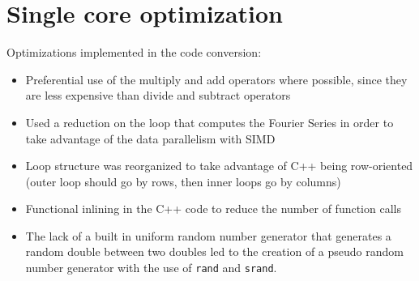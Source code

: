 \section{Single core optimization}
Optimizations implemented in the code conversion:
\begin{itemize}
\item Preferential use of the multiply and add operators where possible, since
they are less expensive than divide and subtract operators
\item Used a reduction on the loop that computes the Fourier Series
  in order to take advantage of the data parallelism with SIMD
\item Loop structure was reorganized to take advantage of C++ being
  row-oriented (outer loop should go by rows, then inner loops go by columns)
\item Functional inlining in the C++ code to reduce the number of function calls
\item The lack of a built in uniform random number generator that generates a random
double between two doubles led to the creation of a pseudo random number
generator with the use of \texttt{rand} and \texttt{srand}.
\end{itemize}

